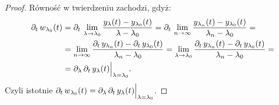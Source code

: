 \begin{proof}
Równość w twierdzeniu zachodzi, gdyż:
%
  \begin{align*}
    \pd{t} w_{\l_0}(t) &= \pd{t} \lim_{\l \to \l_0}  \frac{ y_\l(t) - y_{\l_0}(t) }{ \l - \l_0 } = \pd{t} \lim_{n \to 
    \infty}
    \frac{ y_{\l_n}(t) - y_{\l_0}(t) }{ \l_n - \l_0 } = \\
    &= \lim_{n \to \infty} \frac{  \pd{t} y_{\l_n}(t) -  \pd{t} y_{\l_0}(t) }{ \l_n - \l_0 } = \lim_{\l \to \l_0} 
    \frac{  
    \pd{t} y_{\l_n}(t) -  \pd{t} y_{\l_0}(t) }{ \l_n - \l_0 } = \\
    & = \pd{\l } \pd{t} y_\l (t) \Big\vert_{ \l = \l_0 } \text{.}
  \end{align*}
%
  Czyli istotnie $\pd{t} w_{\l_0}(t) = \pd{\l } \pd{t} y_\l (t) \Big\vert_{ \l = \l_0 }$.
\end{proof}


























